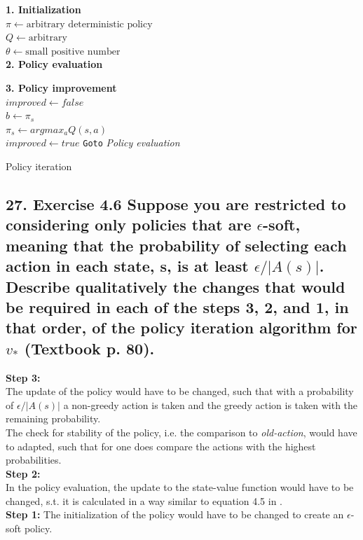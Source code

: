 \begin{algorithm}[ht]
\textbf{1. Initialization}\\
$\pi \leftarrow \text{arbitrary deterministic policy}$\\
$Q \leftarrow \text{arbitrary}$ \\
$\theta \leftarrow \text{small positive number}$ \\
\vspace{.5cm}
\textbf{2. Policy evaluation}\

 \vspace{1cm}
 \textbf{3. Policy improvement} \\
 $improved \leftarrow false$ \\
 {
	$b \leftarrow \pi_s$ \\
	$\pi_s \leftarrow argmax_a Q(s, a)$\\
	{
		$improved \leftarrow true$	
	}
 }
 {
	\texttt{Goto} \textit{Policy evaluation} 
 }
 \caption{Policy iteration}
\end{algorithm}

\subsection*{27. Exercise 4.6 Suppose you are restricted to considering only policies that are $\epsilon$-soft, meaning that the probability of selecting each action in each state, s, is at least $\epsilon/|A(s)|$. Describe qualitatively the changes that would be required in each of the steps 3, 2, and 1, in that order, of the policy iteration algorithm for $v_\ast$ (Textbook p. 80).}
\textbf{Step 3:}
\\
The update of the policy would have to be changed, such that with a probability of $\epsilon / |A(s)|$ a non-greedy action is taken and the greedy action is taken with the remaining probability.\\
The check for stability of the policy, i.e. the comparison to \textit{old-action}, would have to adapted, such that for one does compare the actions with the highest probabilities.
\\
\textbf{Step 2:}
\\
In the policy evaluation, the update to the state-value function would have to be changed, s.t. it is calculated in a way similar to equation 4.5 in \cite{Sutton2018}.
\\
\textbf{Step 1:}
The initialization of the policy would have to be changed to create an $\epsilon$-soft policy.

